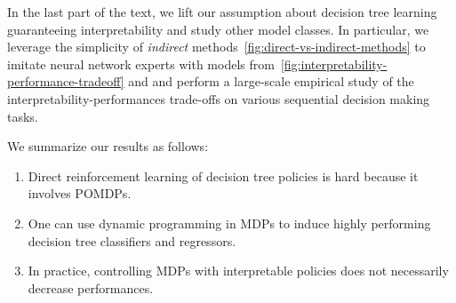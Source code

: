 In the last part of the text, we lift our assumption about decision tree learning guaranteeing interpretability and study other model classes.
In particular, we leverage the simplicity of \textit{indirect} methods~\ref{fig:direct-vs-indirect-methods} to imitate neural network experts with models from~\ref{fig:interpretability-performance-tradeoff} and and perform a large-scale empirical study of the interpretability-performances trade-offs on various sequential decision making tasks.


We summarize our results as follows:

\begin{enumerate}
    \item Direct reinforcement learning of decision tree policies is hard because it involves POMDPs.
    \item One can use dynamic programming in MDPs to induce highly performing decision tree classifiers and regressors.
    \item In practice, controlling MDPs with interpretable policies does not necessarily decrease performances.
\end{enumerate}

        
